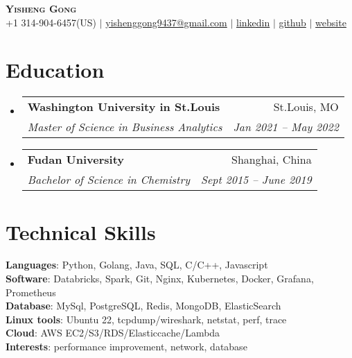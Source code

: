 \documentclass[letterpaper,11pt]{article}
\makeatletter
\newcommand{\resumeSubheading}[4]{
  \vspace{-2pt}\item
    \begin{tabular*}{0.97\textwidth}[t]{l@{\extracolsep{\fill}}r}
      \textbf{#1} & #2 \\
      \textit{\small#3} & \textit{\small #4} \\
    \end{tabular*}\vspace{-7pt}
}
\newcommand{\resumeSubHeadingListStart}{\begin{itemize}[leftmargin=0.15in, label={}]}
\newcommand{\resumeSubHeadingListEnd}{\end{itemize}}
\makeatother
\begin{document}

\begin{center}
    \textbf{\Huge \scshape Yisheng Gong} \\ \vspace{1pt}
    \small +1 314-904-6457(US) $|$ \href{mailto:x@x.com}{{yishenggong9437@gmail.com}} $|$ \href{https://www.linkedin.com/in/yisheng-gong1997}{{linkedin}} $|$
    \href{https://www.github.com/gongyisheng}{{github}} $|$ \href{https://yishenggong.com}{{website}}
\end{center}


\section{Education}
  \resumeSubHeadingListStart
    \resumeSubheading
      {Washington University in St.Louis}{St.Louis, MO}
      {Master of Science in Business Analytics}{Jan 2021 -- May 2022}
    \resumeSubheading
      {Fudan University}{Shanghai, China}
      {Bachelor of Science in Chemistry }{Sept 2015 -- June 2019}
  \resumeSubHeadingListEnd

\section{Technical Skills}
 \begin{itemize}[leftmargin=0.15in, label={}]
    \small{\item{
     \textbf{Languages}{: Python, Golang, Java, SQL, C/C++, Javascript} \\
     \textbf{Software}{: Databricks, Spark, Git, Nginx, Kubernetes, Docker, Grafana, Prometheus} \\
     \textbf{Database}{: MySql, PostgreSQL, Redis, MongoDB, ElasticSearch} \\
     \textbf{Linux tools}{: Ubuntu 22, tcpdump/wireshark, netstat, perf, trace}\\
     \textbf{Cloud}{: AWS EC2/S3/RDS/Elasticcache/Lambda} \\
     \textbf{Interests}{: performance improvement, network, database}
    }}
 \end{itemize}
\end{document}
